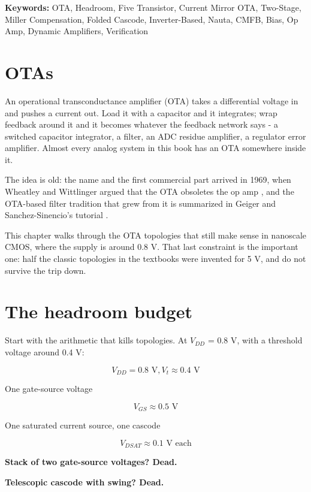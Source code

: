 \textbf{Keywords:} OTA, Headroom, Five Transistor, Current Mirror OTA,
Two-Stage, Miller Compensation, Folded Cascode, Inverter-Based, Nauta,
CMFB, Bias, Op Amp, Dynamic Amplifiers, Verification

\section{OTAs}\label{otas}

An operational transconductance amplifier (OTA) takes a differential
voltage in and pushes a current out. Load it with a capacitor and it
integrates; wrap feedback around it and it becomes whatever the feedback
network says - a switched capacitor integrator, a filter, an ADC residue
amplifier, a regulator error amplifier. Almost every analog system in
this book has an OTA somewhere inside it.

The idea is old: the name and the first commercial part arrived in 1969,
when Wheatley and Wittlinger argued that the OTA obsoletes the op amp
, and the OTA-based filter tradition
that grew from it is summarized in Geiger and Sanchez-Sinencio's
tutorial .

This chapter walks through the OTA topologies that still make sense in
nanoscale CMOS, where the supply is around 0.8 V. That last constraint
is the important one: half the classic topologies in the textbooks were
invented for 5 V, and do not survive the trip down.

\section{The headroom budget}\label{the-headroom-budget}

Start with the arithmetic that kills topologies. At \(V_{DD}\) = 0.8 V,
with a threshold voltage around 0.4 V:

\[ V_{DD} = 0.8 \text{ V}, V_{t} \approx 0.4\text{ V} \]

One gate-source voltage

\[ V_{GS} \approx 0.5 \text{ V} \]

One saturated current source, one cascode

\[ V_{DSAT} \approx 0.1 \text{ V each} \]

\textbf{Stack of two gate-source voltages? Dead.}

\textbf{Telescopic cascode with swing? Dead.}

